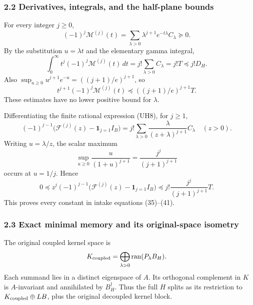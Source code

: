 \documentclass[11pt]{article}
\begin{document}
\subsubsection{2.2 Derivatives, integrals, and the half-plane bounds}\label{derivatives-integrals-and-the-half-plane-bounds}

For every integer \(j\ge0\), \[
 (-1)^j\mathcal M^{(j)}(t)
 =\sum_{\lambda>0}\lambda^{j+1}e^{-t\lambda}C_\lambda\succeq0.
\] By the substitution \(u=\lambda t\) and the elementary gamma integral, \[
 \int_0^\infty t^j(-1)^j\mathcal M^{(j)}(t)\,dt
 =j!\sum_{\lambda>0}C_\lambda=j!T\preceq j!D_H.
 \tag{UH12}
\] Also \(\sup_{u\ge0}u^{j+1}e^{-u}=((j+1)/e)^{j+1}\), so \[
 t^{j+1}(-1)^j\mathcal M^{(j)}(t)
 \preceq ((j+1)/e)^{j+1}T.
 \tag{UH13}
\] These estimates have no lower positive bound for \(\lambda\).

Differentiating the finite rational expression (UH8), for \(j\ge1\), \[
 (-1)^{j-1}\bigl(\mathcal F^{(j)}(z)-\mathbf1_{j=1}I_B\bigr)
 =j!\sum_{\lambda>0}\frac{\lambda}{(z+\lambda)^{j+1}}C_\lambda
 \quad(z>0).
\] Writing \(u=\lambda/z\), the scalar maximum \[
 \sup_{u\ge0}\frac{u}{(1+u)^{j+1}}
 =\frac{j^j}{(j+1)^{j+1}}
\] occurs at \(u=1/j\). Hence \[
 0\preceq z^j(-1)^{j-1}
 \bigl(\mathcal F^{(j)}(z)-\mathbf1_{j=1}I_B\bigr)
 \preceq j!\frac{j^j}{(j+1)^{j+1}}T.
 \tag{UH14}
\] This proves every constant in intake equations (35)--(41).

\subsubsection{2.3 Exact minimal memory and its original-space isometry}\label{exact-minimal-memory-and-its-original-space-isometry}

The original coupled kernel space is \[
 K_{\rm coupled}=\bigoplus_{\lambda>0}\operatorname{ran}(P_\lambda B_H).
\] Each summand lies in a distinct eigenspace of \(A\). Its orthogonal complement in \(K\) is \(A\)-invariant and annihilated by \(B_H^\dagger\). Thus the full \(H\) splits as its restriction to \(K_{\rm coupled}\oplus LB\), plus the original decoupled kernel block.
\end{document}
